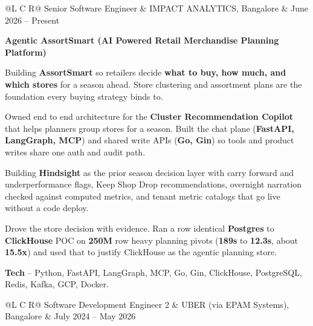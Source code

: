 
\noindent
\begin{tabularx}{\textwidth}{@{}L C R@{}}
\textcolor{role}{Senior Software Engineer} & \textcolor{company}{IMPACT ANALYTICS, Bangalore} & \textcolor{date}{June 2026 -- Present}\\
\end{tabularx}
\vspace{-2ex}

\textcolor{Project}{\textbf{Agentic AssortSmart (AI Powered Retail Merchandise Planning Platform)}}
\vspace{-1ex}
\begin{zitemize}
    \item Building \textbf{AssortSmart} so retailers decide \textbf{what to buy, how much, and which stores} for a season ahead. Store clustering and assortment plans are the foundation every buying strategy binds to.
    \item Owned end to end architecture for the \textbf{Cluster Recommendation Copilot} that helps planners group stores for a season. Built the chat plane (\textbf{FastAPI, LangGraph, MCP}) and shared write APIs (\textbf{Go, Gin}) so tools and product writes share one auth and audit path.
    \item Building \textbf{Hindsight} as the prior season decision layer with carry forward and underperformance flags, Keep Shop Drop recommendations, overnight narration checked against computed metrics, and tenant metric catalogs that go live without a code deploy.
    \item Drove the store decision with evidence. Ran a row identical \textbf{Postgres} to \textbf{ClickHouse} POC on \textbf{250M} row heavy planning pivots (\textbf{189s} to \textbf{12.3s}, about \textbf{15.5x}) and used that to justify ClickHouse as the agentic planning store.
    \item \textbf{Tech} -- Python, FastAPI, LangGraph, MCP, Go, Gin, ClickHouse, PostgreSQL, Redis, Kafka, GCP, Docker.
\end{zitemize}

\vspace{1ex}
\noindent
\begin{tabularx}{\textwidth}{@{}L C R@{}}
\textcolor{role}{Software Development Engineer 2} & \textcolor{company}{UBER (via EPAM Systems), Bangalore} & \textcolor{date}{July 2024 -- May 2026}\\
\end{tabularx}
\vspace{-2ex}

